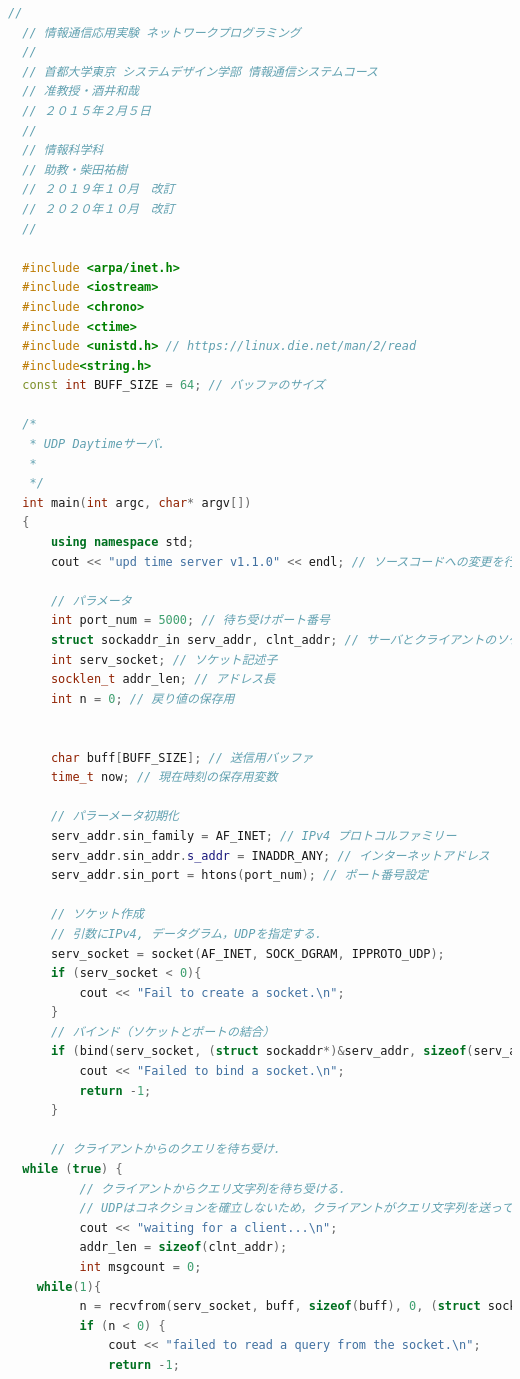 \documentclass[fleqn, a4paper. 12pt]{ltjsarticle}
\begin{document}
\begin{lstlisting}[language=C++]
  //
  // 情報通信応用実験 ネットワークプログラミング
  //
  // 首都大学東京 システムデザイン学部 情報通信システムコース
  // 准教授・酒井和哉
  // ２０１５年２月５日
  //
  // 情報科学科
  // 助教・柴田祐樹
  // ２０１９年１０月　改訂
  // ２０２０年１０月　改訂
  //
  
  #include <arpa/inet.h>
  #include <iostream>
  #include <chrono>
  #include <ctime>
  #include <unistd.h> // https://linux.die.net/man/2/read
  #include<string.h>
  const int BUFF_SIZE = 64; // バッファのサイズ
  
  /*
   * UDP Daytimeサーバ.
   *
   */
  int main(int argc, char* argv[])
  {
      using namespace std;
      cout << "upd time server v1.1.0" << endl; // ソースコードへの変更を行ったら数値を変える．
  
      // パラメータ
      int port_num = 5000; // 待ち受けポート番号
      struct sockaddr_in serv_addr, clnt_addr; // サーバとクライアントのソケットアドレス
      int serv_socket; // ソケット記述子
      socklen_t addr_len; // アドレス長
      int n = 0; // 戻り値の保存用
  
  
      char buff[BUFF_SIZE]; // 送信用バッファ
      time_t now; // 現在時刻の保存用変数
  
      // パラーメータ初期化
      serv_addr.sin_family = AF_INET; // IPv4 プロトコルファミリー
      serv_addr.sin_addr.s_addr = INADDR_ANY; // インターネットアドレス
      serv_addr.sin_port = htons(port_num); // ポート番号設定
  
      // ソケット作成
      // 引数にIPv4, データグラム，UDPを指定する．
      serv_socket = socket(AF_INET, SOCK_DGRAM, IPPROTO_UDP);
      if (serv_socket < 0){
          cout << "Fail to create a socket.\n";
      }
      // バインド（ソケットとポートの結合）
      if (bind(serv_socket, (struct sockaddr*)&serv_addr, sizeof(serv_addr)) < 0) {
          cout << "Failed to bind a socket.\n";
          return -1;
      }
  
      // クライアントからのクエリを待ち受け．
  while (true) {
          // クライアントからクエリ文字列を待ち受ける．
          // UDPはコネクションを確立しないため，クライアントがクエリ文字列を送ってくるのを待機．
          cout << "waiting for a client...\n";
          addr_len = sizeof(clnt_addr);
          int msgcount = 0;
    while(1){
          n = recvfrom(serv_socket, buff, sizeof(buff), 0, (struct sockaddr*)&clnt_addr, &addr_len);
          if (n < 0) {
              cout << "failed to read a query from the socket.\n";
              return -1;
          

\end{lstlisting}
\end{document}
